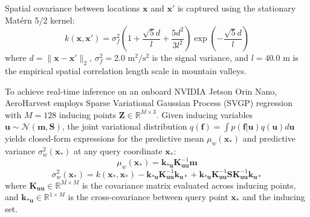 \documentclass[12pt,a4paper,oneside]{report}
\begin{document}
Spatial covariance between locations $\mathbf{x}$ and $\mathbf{x}'$ is captured using the stationary Mat\'ern 5/2 kernel:
\begin{equation}
    k(\mathbf{x}, \mathbf{x}') = \sigma_f^2 \left( 1 + \frac{\sqrt{5} d}{l} + \frac{5 d^2}{3 l^2} \right) \exp\left( -\frac{\sqrt{5} d}{l} \right)
    \label{eq:matern52}
\end{equation}
where $d = \|\mathbf{x} - \mathbf{x}'\|_2$, $\sigma_f^2 = 2.0\text{ m}^2/\text{s}^2$ is the signal variance, and $l = 40.0\text{ m}$ is the empirical spatial correlation length scale in mountain valleys.

To achieve real-time inference on an onboard NVIDIA Jetson Orin Nano, AeroHarvest employs Sparse Variational Gaussian Process (SVGP) regression with $M = 128$ inducing points $\mathbf{Z} \in \mathbb{R}^{M \times 3}$. Given inducing variables $\mathbf{u} \sim \mathcal{N}(\mathbf{m}, \mathbf{S})$, the joint variational distribution $q(\mathbf{f}) = \int p(\mathbf{f}|\mathbf{u}) q(\mathbf{u}) d\mathbf{u}$ yields closed-form expressions for the predictive mean $\mu_w(\mathbf{x}_*)$ and predictive variance $\sigma_w^2(\mathbf{x}_*)$ at any query coordinate $\mathbf{x}_*$:
\begin{equation}
    \mu_w(\mathbf{x}_*) = \mathbf{k}_{* \mathbf{u}} \mathbf{K}_{\mathbf{u}\mathbf{u}}^{-1} \mathbf{m}
    \label{eq:gp_mean}
\end{equation}
\begin{equation}
    \sigma_w^2(\mathbf{x}_*) = k(\mathbf{x}_*, \mathbf{x}_*) - \mathbf{k}_{* \mathbf{u}} \mathbf{K}_{\mathbf{u}\mathbf{u}}^{-1} \mathbf{k}_{\mathbf{u} *} + \mathbf{k}_{* \mathbf{u}} \mathbf{K}_{\mathbf{u}\mathbf{u}}^{-1} \mathbf{S} \mathbf{K}_{\mathbf{u}\mathbf{u}}^{-1} \mathbf{k}_{\mathbf{u} *}
    \label{eq:gp_var}
\end{equation}
where $\mathbf{K}_{\mathbf{u}\mathbf{u}} \in \mathbb{R}^{M \times M}$ is the covariance matrix evaluated across inducing points, and $\mathbf{k}_{* \mathbf{u}} \in \mathbb{R}^{1 \times M}$ is the cross-covariance between query point $\mathbf{x}_*$ and the inducing set.
\end{document}
